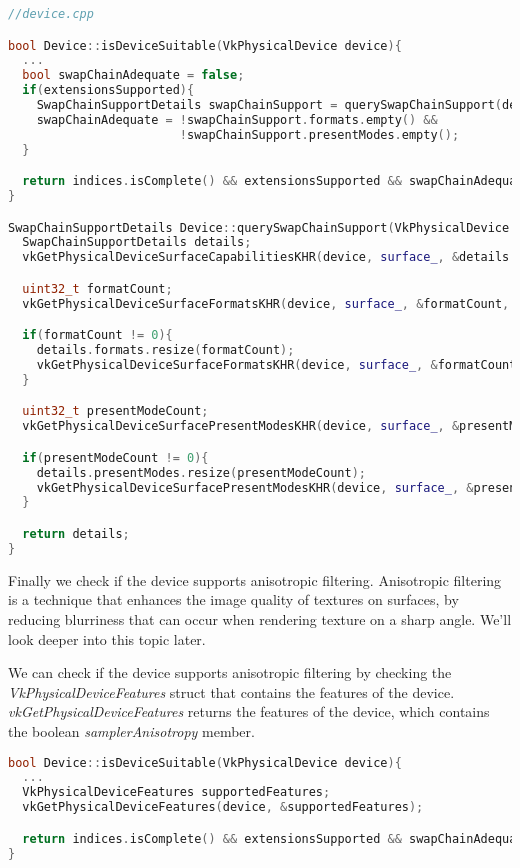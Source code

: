 \documentclass[12pt]{report} \usepackage{preamble}
\begin{document}
\begin{lstlisting}[language=C++]
//device.cpp

bool Device::isDeviceSuitable(VkPhysicalDevice device){
  ...
  bool swapChainAdequate = false;
  if(extensionsSupported){
    SwapChainSupportDetails swapChainSupport = querySwapChainSupport(device);
    swapChainAdequate = !swapChainSupport.formats.empty() &&
                        !swapChainSupport.presentModes.empty();
  }

  return indices.isComplete() && extensionsSupported && swapChainAdequate;
}

SwapChainSupportDetails Device::querySwapChainSupport(VkPhysicalDevice device){
  SwapChainSupportDetails details;
  vkGetPhysicalDeviceSurfaceCapabilitiesKHR(device, surface_, &details.capabilities);

  uint32_t formatCount;
  vkGetPhysicalDeviceSurfaceFormatsKHR(device, surface_, &formatCount, nullptr);

  if(formatCount != 0){
    details.formats.resize(formatCount);
    vkGetPhysicalDeviceSurfaceFormatsKHR(device, surface_, &formatCount, details.formats.data());
  }

  uint32_t presentModeCount;
  vkGetPhysicalDeviceSurfacePresentModesKHR(device, surface_, &presentModeCount, nullptr);

  if(presentModeCount != 0){
    details.presentModes.resize(presentModeCount);
    vkGetPhysicalDeviceSurfacePresentModesKHR(device, surface_, &presentModeCount, details.presentModes.data());
  }

  return details;
}
\end{lstlisting}

Finally we check if the device supports anisotropic filtering. Anisotropic filtering is a technique
that enhances the image quality of textures on surfaces, by reducing blurriness that can occur when
rendering texture on a sharp angle. We'll look deeper into this topic later.

We can check if the device supports anisotropic filtering by checking the \textit{VkPhysicalDeviceFeatures}
struct that contains the features of the device. \textit{vkGetPhysicalDeviceFeatures} returns the features
of the device, which contains the boolean \textit{samplerAnisotropy} member.

\begin{lstlisting}[language=C++]
bool Device::isDeviceSuitable(VkPhysicalDevice device){
  ...
  VkPhysicalDeviceFeatures supportedFeatures;
  vkGetPhysicalDeviceFeatures(device, &supportedFeatures);

  return indices.isComplete() && extensionsSupported && swapChainAdequate && supportedFeatures.samplerAnisotropy;
}
\end{lstlisting}
\end{document}
